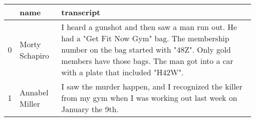 \begin{tabular}{lll}
\toprule
 & name & transcript \\
\midrule
0 & Morty Schapiro & I heard a gunshot and then saw a man run out. He had a "Get Fit Now Gym" bag. The membership number on the bag started with "48Z". Only gold members have those bags. The man got into a car with a plate that included "H42W". \\
1 & Annabel Miller & I saw the murder happen, and I recognized the killer from my gym when I was working out last week on January the 9th. \\
\bottomrule
\end{tabular}

